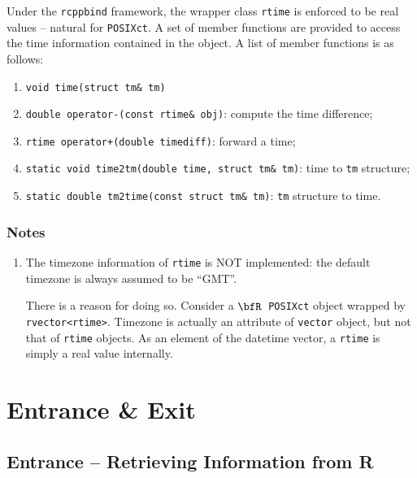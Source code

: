 \documentclass{article}
\newcommand{\R}{$\bfR$}
\begin{document}
Under the \texttt{rcppbind} framework, the wrapper class
\texttt{rtime} is enforced to be real values -- natural for
\texttt{POSIXct}. A set of member functions are provided to
access the time information contained in the object. A list
of member functions is as follows:
\begin{enumerate}
  \item \texttt{void time(struct tm\& tm)} 
  \item \texttt{double operator-(const rtime\& obj)}: compute the time difference;
  \item \texttt{rtime operator+(double timediff)}: forward a time;
  \item \texttt{static void time2tm(double time, struct tm\&
    tm)}: time to \texttt{tm} structure;
  \item \texttt{static double tm2time(const struct tm\& tm)}:
    \texttt{tm} structure to time.
\end{enumerate}

\subsubsection*{Notes}
\begin{enumerate}
  \item The timezone information of \texttt{rtime} is NOT
    implemented: the default timezone is always assumed to be
    ``GMT''.
    
    There is a reason for doing so. Consider a \R\
    \texttt{POSIXct} object wrapped by
    \texttt{rvector<rtime>}. Timezone is actually an
    attribute of \texttt{vector} object, but not that of
    \texttt{rtime} objects. As an element of the datetime
    vector, a \texttt{rtime} is simply a real value
    internally.
\end{enumerate}

\section{Entrance \& Exit}\label{sec:entrance-exit}

\subsection{Entrance -- Retrieving Information from R}
\end{document}
